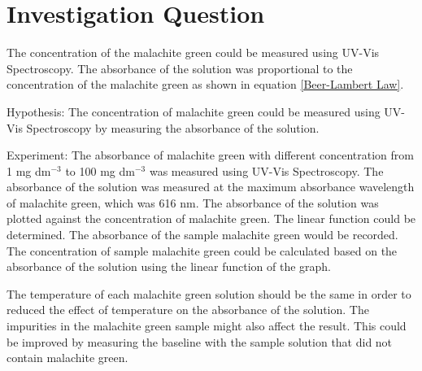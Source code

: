 \documentclass[twocolumn]{article} %
\begin{document}





\section{Investigation Question}

The concentration of the malachite green could be measured using UV-Vis Spectroscopy. The absorbance of the solution was proportional to the concentration of the malachite green as shown in equation \ref{Beer-Lambert Law}.

Hypothesis: The concentration of malachite green could be measured using UV-Vis Spectroscopy by measuring the absorbance of the solution.

Experiment: The absorbance of malachite green with different concentration from 1 mg dm$^{-3}$ to 100 mg dm$^{-3}$ was measured using UV-Vis Spectroscopy. The absorbance of the solution was measured at the maximum absorbance wavelength of malachite green, which was 616 nm. The absorbance of the solution was plotted against the concentration of malachite green. The linear function could be determined. The absorbance of the sample malachite green would be recorded. The concentration of sample malachite green could be calculated based on the absorbance of the solution using the linear function of the graph. 

The temperature of each malachite green solution should be the same in order to reduced the effect of temperature on the absorbance of the solution. The impurities in the malachite green sample might also affect the result. This could be improved by measuring the baseline with the sample solution that did not contain malachite green.



\end{document}
